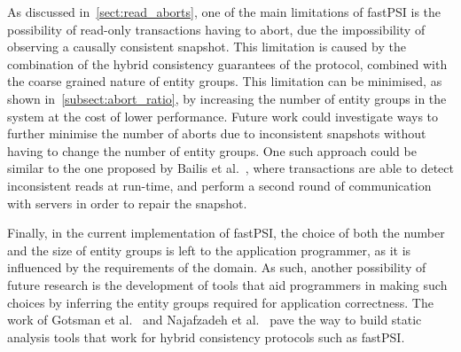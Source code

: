 As discussed in~\ref{sect:read_aborts}, one of the main limitations of fastPSI is the possibility of read-only transactions having to abort, due the impossibility of observing a causally consistent snapshot. This limitation is caused by the combination of the hybrid consistency guarantees of the protocol, combined with the coarse grained nature of entity groups. This limitation can be minimised, as shown in~\ref{subsect:abort_ratio}, by increasing the number of entity groups in the system at the cost of lower performance. Future work could investigate ways to further minimise the number of aborts due to inconsistent snapshots without having to change the number of entity groups. One such approach could be similar to the one proposed by Bailis et al.~\citep{bailis_ramp}, where transactions are able to detect inconsistent reads at run-time, and perform a second round of communication with servers in order to repair the snapshot.

Finally, in the current implementation of fastPSI, the choice of both the number and the size of entity groups is left to the application programmer, as it is influenced by the requirements of the domain. As such, another possibility of future research is the development of tools that aid programmers in making such choices by inferring the entity groups required for application correctness. The work of Gotsman et al.~\citep{gotsman_cher} and Najafzadeh et al.~\citep{cise_tool} pave the way to build static analysis tools that work for hybrid consistency protocols such as fastPSI.
